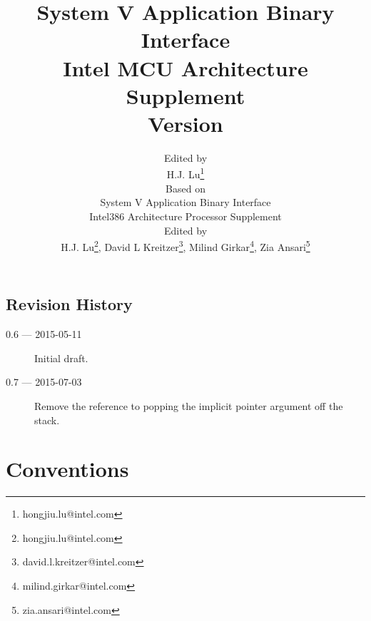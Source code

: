 \documentclass[12pt]{report}
\begin{document}
\author{Edited by\\
  H.J. Lu\thanks{hongjiu.lu@intel.com} \\
  \small
  Based on\\
  \small
  System V Application Binary Interface\\
  \small
  Intel386 Architecture Processor Supplement\\
  \small
  Edited by\\
  \small
  H.J. Lu\thanks{hongjiu.lu@intel.com},
  David L Kreitzer\thanks{david.l.kreitzer@intel.com},
  Milind Girkar\thanks{milind.girkar@intel.com},
  Zia Ansari\thanks{zia.ansari@intel.com}}

\title{System V Application Binary Interface\\
{\Large Intel MCU Architecture Supplement\\
Version \version}}
\maketitle
\tableofcontents
\listoftables
\listoffigures

\section*{Revision History}

\begin{description}

\item[0.6 --- 2015-05-11] Initial draft.
\item[0.7 --- 2015-07-03] Remove the reference to popping the implicit
pointer argument off the stack.
\end{description}







\chapter{Conventions}


\appendix

\end{document}
